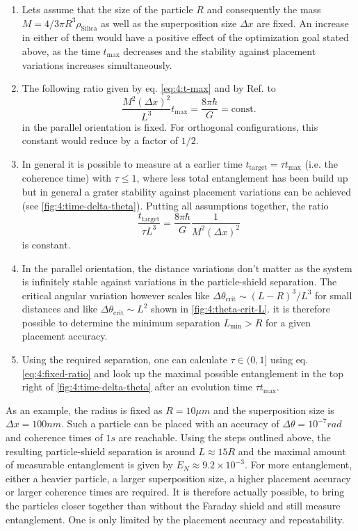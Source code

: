 \begin{enumerate}
  \item Lets assume that the size of the particle $R$ and consequently the mass $M=4/3 \pi R^3 \rho_\mathrm{Silica}$ as well as the superposition size $\Delta x$ are fixed. An increase in either of them would have a positive effect of the optimization goal stated above, as the time $t_\mathrm{max}$ decreases and the stability against placement variations increases simultaneously.
  \item The following ratio given by eq. \eqref{eq:4:t-max} and by Ref. \cite{Aspelmeyer_2024} to
  \begin{equation}
    \frac{M^2 (\Delta x)^2}{L^3}t_\mathrm{max} = \frac{8 \pi \hbar}{G} = \mathrm{const.} 
  \end{equation} 
  in the parallel orientation is fixed. For orthogonal configurations, this constant would reduce by a factor of $1/2$. 
  \item In general it is possible to measure at a earlier time $t_\mathrm{target} = \tau t_\mathrm{max}$ (i.e. the coherence time) with $\tau \leq 1$, where less total entanglement has been build up but in general a grater stability against placement variations can be achieved (see \cref{fig:4:time-delta-theta}). Putting all assumptions together, the ratio
  \begin{equation}\label{eq:4:fixed-ratio}
    \frac{t_\mathrm{target}}{\tau L^3} = \frac{8\pi \hbar}{G} \frac{1}{M^2 (\Delta x)^2}
  \end{equation}
  is constant.
  \item In the parallel orientation, the distance variations don't matter as the system is infinitely stable against variations in the particle-shield separation. The critical angular variation however scales like $\Delta \theta_\mathrm{crit} \sim (L-R)^3/L^3$ for small distances and like $\Delta \theta_\mathrm{crit} \sim L^2$ shown in \cref{fig:4:theta-crit-L}. it is therefore possible to determine the minimum separation $L_\mathrm{min} > R$ for a given placement accuracy.
  \item Using the required separation, one can calculate $\tau \in (0, 1]$ using eq. \eqref{eq:4:fixed-ratio} and look up the maximal possible entanglement in the top right of \cref{fig:4:time-delta-theta} after an evolution time $\tau t_\mathrm{max}$.
\end{enumerate}
As an example, the radius is fixed as $R=10\si{\mu m}$ and the superposition size is $\Delta x = 100\si{nm}$. Such a particle can be placed with an accuracy of $\Delta \theta = 10^{-7} \si{rad}$ and coherence times of $1\si{s}$ are reachable. 
Using the steps outlined above, the resulting particle-shield separation is around $L\approx 15R$ and the maximal amount of measurable entanglement is given by $E_N \approx 9.2\times 10^{-3}$.
For more entanglement, either a heavier particle, a larger superposition size, a higher placement accuracy or larger coherence times are required. 
It is therefore actually possible, to bring the particles closer together than without the Faraday shield and still measure entanglement. One is only limited by the placement accuracy and repeatability.